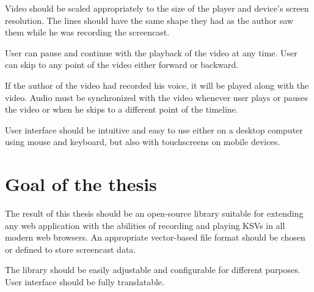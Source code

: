 Video should be scaled appropriately to the size of the player and device's screen resolution. The lines should have the same shape they had as the author saw them while he was recording the screencast.

User can pause and continue with the playback of the video at any time. User can skip to any point of the video either forward or backward.

If the author of the video had recorded his voice, it will be played along with the video. Audio must be synchronized with the video whenever user plays or pauses the video or when he skips to a different point of the timeline.

User interface should be intuitive and easy to use either on a desktop computer using mouse and keyboard, but also with touchscreens on mobile devices.

\section{Goal of the thesis}

The result of this thesis should be an open-source library suitable for extending any web application with the abilities of recording and playing KSVs in all modern web browsers. An appropriate vector-based file format should be chosen or defined to store screencast data.

The library should be easily adjustable and configurable for different purposes. User interface should be fully translatable.